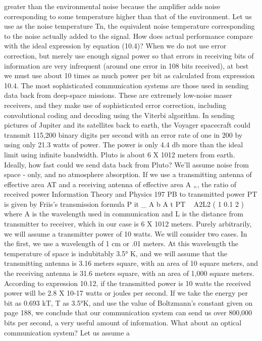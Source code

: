 {{{{{{{{{{{greater than the environmental noise because the amplifier adds
noise corresponding to some temperature higher than that of the
environment. Let us use as the noise temperature Tn, the equivalent
noise temperature corresponding to the noise actually added to the
signal. How does actual performance compare with the ideal expression
by equation (10.4)?
When we do not use error correction, but merely use enough
signal power so that errors in receiving bits of information are very
infrequent (around one error in 108 bits received), at best we must
use about 10 times as much power per bit as calculated from
expression 10.4.
The most sophisticated communication systems are those used
in sending data back from deep-space missions. These are extremely
low-noise maser receivers, and they make use of sophisticated
error correction, including convolutional coding and decoding
using the Viterbi algorithm. In sending pictures of Jupiter and its
satellites back to earth, the Voyager spacecraft could transmit
115,200 binary digits per second with an error rate of one in 200
by using only 21.3 watts of power. The power is only 4.4 db more
than the ideal limit using infinite bandwidth.
Pluto is about 6 X 1012 meters from earth. Ideally, how fast
could we send data back from Pluto? We’ll assume noise from space
- only, and no atmosphere absorption.
If we use a transmitting antenna of effective area AT and a receiving
antenna of effective area A „, the ratio of received power
Information Theory and Physics 197
PB to transmitted power PT is given by Friis’s transmission formula
P it _ A b A t
PT ~ A2L2
( 1 0.1 2 )
where A is the wavelength used in communication and L is the
distance from transmitter to receiver, which in our case is 6 X 1012
meters.
Purely arbitrarily, we will assume a transmitter power of 10
watts. We will consider two cases. In the first, we use a wavelength
of 1 cm or .01 meters. At this wavelength the temperature of space
is indubitably 3.5° K, and we will assume that the transmitting
antenna is 3.16 meters square, with an area of 10 square meters, and
the receiving antenna is 31.6 meters square, with an area of 1,000
square meters. According to expression 10.12, if the transmitted
power is 10 watts the received power will be 2.8 X 10-17 watts or
joules per second. If we take the energy per bit as 0.693 kT, T as
3.5°K, and use the value of Boltzmann’s constant given on page
188, we conclude that our communication system can send us over
800,000 bits per second, a very useful amount of information.
What about an optical communication system? Let us assume a
}}}}}}}}}}}
